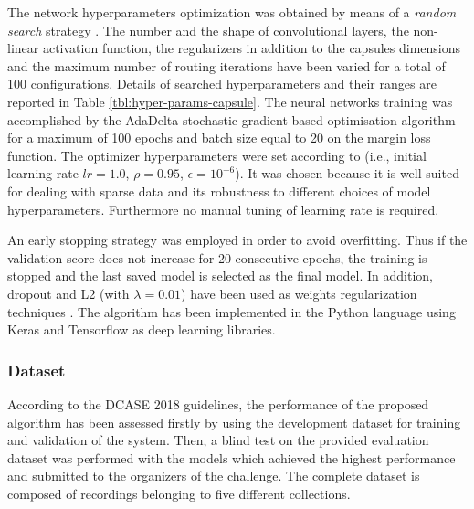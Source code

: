 The network hyperparameters optimization was obtained by means of a \textit{random search} strategy  \cite{bergstra2012random}.  The number and the shape of convolutional layers, the non-linear activation function, the regularizers in addition to the capsules dimensions and the maximum number of routing iterations have been varied for a total of 100 configurations. Details of searched hyperparameters and their ranges are reported in Table \ref{tbl:hyper-params-capsule}.
The neural networks training was accomplished by the AdaDelta stochastic gradient-based optimisation algorithm \cite{zeiler2012adadelta} for a maximum of 100 epochs and batch size equal to 20 on the margin loss function. The optimizer hyperparameters were set according to \cite{zeiler2012adadelta} (i.e., initial learning rate $lr=1.0$, $\rho=0.95$, $\epsilon=10^{-6}$). It was chosen because it is well-suited for dealing with sparse data and its robustness to different choices of model hyperparameters. Furthermore no manual tuning of learning rate is required.

An early stopping strategy was employed in order to avoid overfitting. Thus if the validation score does not increase for 20 consecutive epochs, the training is stopped and the last saved model is selected as the final model. In addition, dropout and L2 (with $\lambda=0.01$) have been used as weights regularization techniques \cite{srivastava2014dropout}. 
The algorithm has been implemented in the Python language using Keras \cite{chollet2015keras} and Tensorflow \cite{tensorflow2015-whitepaper} as deep learning libraries.


\subsubsection{Dataset}
\label{ssec:dataset}
According to the DCASE 2018 guidelines, the performance of the proposed algorithm has been assessed firstly by using the development dataset for training and validation of the system. Then, a blind test on the provided evaluation dataset was performed with the models which achieved the highest performance and submitted to the organizers of the challenge. The complete dataset is composed of recordings belonging to five different collections.  

